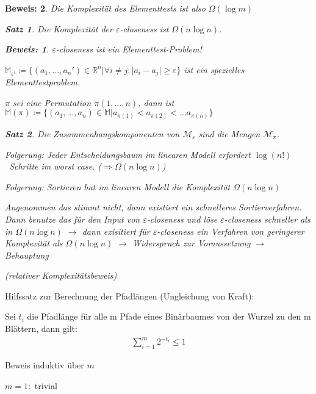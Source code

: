 \documentclass[ngerman,draft,parskip=half*,twoside]{scrreprt}
\theoremstyle{break}
\newtheorem{satz}{Satz}[chapter]
\theoremstyle{nonumberbreak}
\newtheorem{beweis}{Beweis:}
\newcommand*{\M}{\mathbb{M}}
\newcommand*{\R}{\mathbb{R}}        %
\begin{document}
\begin{beweis}
Die Komplexität des Elementtests ist also $ \Omega (\log m) $	
  \begin{satz}
  Die Komplexität der $\varepsilon$-closeness ist $ \Omega (n \log n) $.
  \end{satz}

  \begin{beweis}
  $\varepsilon$-closeness ist ein Elementtest-Problem!

  $ \M_{\varepsilon^i} \coloneqq  \lbrace ( a_1, \dots , a_n ') \in \R^n \vert \forall   i \ne j : \vert a_i - a_j 
  \vert \geq \varepsilon \rbrace$ ist ein spezielles Elementtestproblem.
				
  $\pi$ sei eine Permutation $ \pi(1, \dots ,n) $, dann ist
  $ \M(\pi ) \coloneqq  \lbrace (a_1, \dots , a_n) \in \M \vert a_{\pi (1)} < a_{\pi (2)} < \dots a_{\pi (n)}  \rbrace $
	
	
  \begin{satz} 
  Die Zusammenhangskomponenten von $ \mathcal{M}_\varepsilon $ sind die Mengen $ \mathcal{M}_\pi$.
  \end{satz}		
		
  \textit{Folgerung: Jeder Entscheidungsbaum im linearen Modell erfordert $\log (n!)$~Schritte im worst case. 
  ($\Rightarrow \Omega (n \log n)$)}
		
  \end{beweis}	
\textit{Folgerung: Sortieren hat im linearen Modell die Komplexität $\Omega (n \log n)$}
	
Angenommen das stimmt nicht, dann existiert ein schnelleres Sortierverfahren. 
Dann benutze das für den Input von $\varepsilon$-closeness und löse $\varepsilon$-closeness schneller als in $ \Omega (n \log n)$
$ \rightarrow $ dann exisitiert für $\varepsilon$-closeness ein Verfahren von geringerer Komplexität als $ \Omega (n \log n) $
$ \rightarrow $ Widerspruch zur Voraussetzung $ \rightarrow $ Behauptung
		
(relativer Komplexitätsbeweis)
\end{beweis}


% 
Hilfssatz zur Berechnung der Pfadlängen (Ungleichung von Kraft):


Sei $t_{i}$ die Pfadlänge für alle m Pfade eines Binärbaumes von der Wurzel zu den m Blättern, dann gilt:
\begin{gather*}
\sum_{i=1}^{m} 2^{-t_{i}}\leq 1
\end{gather*} 


Beweis induktiv über $m$


$m = 1:$ trivial
\end{document}
